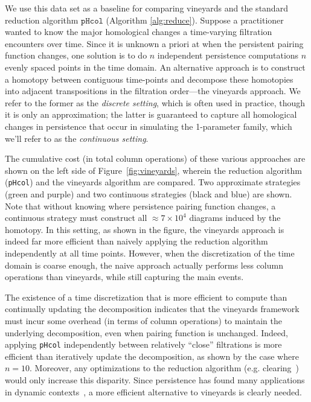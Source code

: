 \documentclass[sn-mathphys]{sn-jnl}
\begin{document}
  We use this data set as a baseline for comparing vineyards and the standard reduction algorithm $\texttt{pHcol}$ (Algorithm \ref{alg:reduce}). Suppose a practitioner wanted to know the major homological changes a time-varying filtration encounters over time.
  Since it is unknown a priori at when the persistent pairing function changes, one solution is to do $n$ independent persistence computations $n$ evenly spaced points in the time domain.  An alternative approach is to construct a homotopy between contiguous time-points and decompose these homotopies into adjacent transpositions in the filtration order---the vineyards approach. 
 We refer to the former as the \emph{discrete setting}, which is often used in practice, though it is only an approximation; the latter is guaranteed to capture all homological changes in persistence that occur in simulating the 1-parameter family, which we'll refer to as the \emph{continuous setting}.  
 
 The cumulative cost (in total column operations) of these various approaches are shown on the left side of Figure~\ref{fig:vineyards}, wherein the reduction algorithm (\texttt{pHcol}) and the vineyards algorithm are compared. Two approximate strategies (green and purple) and two continuous strategies (black and blue) are shown.
  Note that without knowing where persistence pairing function changes, a continuous strategy must construct all $\approx 7 \times 10^{4}$ diagrams induced by the homotopy. 
  In this setting, as shown in the figure, the vineyards approach is indeed far more efficient than naively applying the reduction algorithm independently at all time points.
  However, when the discretization of the time domain is coarse enough, the naive approach actually performs less column operations than vineyards, while still capturing the main events. 
  
  The existence of a time discretization that is more efficient to compute than continually updating the decomposition indicates that the vineyards framework must incur some overhead (in terms of column operations) to maintain the underlying decomposition, even when pairing function is unchanged. 
Indeed, applying \texttt{pHcol} independently between  relatively ``close'' filtrations is more efficient than iteratively update the decomposition, as shown by the case where $n = 10$.
 Moreover, any optimizations to the reduction algorithm (e.g. clearing~\cite{chen2011persistent}) would only increase this disparity.
Since persistence has found many applications in dynamic contexts~\cite{topaz2015topological, xian2020capturing, lesnick2015interactive, kim2020spatiotemporal}, a more efficient alternative to vineyards is clearly needed. 
 
\end{document}
